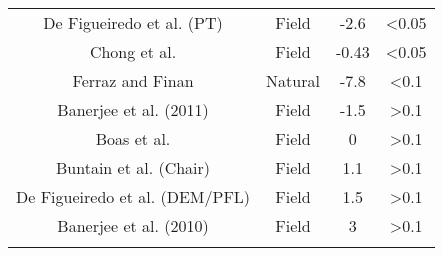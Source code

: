 \begin{table}[!htbp]
\begin{tabular}{@{\extracolsep{5pt}} cccc}
De Figueiredo et al. (PT) & Field & -2.6 & \textless 0.05 \\ 
Chong et al. & Field & -0.43 & \textless 0.05 \\ 
Ferraz and Finan & Natural & -7.8 & \textless 0.1 \\ 
Banerjee et al. (2011) & Field & -1.5 & \textgreater 0.1 \\ 
Boas et al. & Field & 0 & \textgreater 0.1 \\ 
Buntain et al. (Chair) & Field & 1.1 & \textgreater 0.1 \\ 
De Figueiredo et al. (DEM/PFL) & Field & 1.5 & \textgreater 0.1 \\ 
Banerjee et al. (2010) & Field & 3 & \textgreater 0.1 \\ 
\hline \\[-1.8ex] 
\end{tabular} 
\end{table} 
